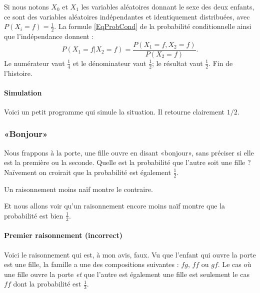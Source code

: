 Si nous notons \( X_0\) et \( X_1\) les variables aléatoires donnant le sexe des deux enfants, ce sont des variables aléatoires indépendantes et identiquement distribuées, avec \( P(X_i=f)=\frac{ 1 }{2}\). La formule \eqref{EqProbCond} de la probabilité conditionnelle ainsi que l'indépendance donnent :
\begin{equation}
	P(X_1=f|X_2=f)=\frac{ P(X_1=f,X_2=f) }{ P(X_2=f) }.
\end{equation}
Le numérateur vaut \( \frac{1}{ 4 }\) et le dénominateur vaut \( \frac{ 1 }{2}\); le résultat vaut \( \frac{ 1 }{2}\). Fin de l'histoire.

\paragraph{Simulation}

Voici un petit programme qui simule la situation. Il retourne clairement \( 1/2\).


\subsubsection{«Bonjour»}

Nous frappons à la porte, une fille ouvre en disant «bonjour», sans préciser si elle est la première ou la seconde. Quelle est la probabilité que l'autre soit une fille ? Naïvement on croirait que la probabilité est également \( \frac{ 1 }{2}\).

Un raisonnement moins naïf montre le contraire.

Et nous allons voir qu'un raisonnement encore moins naïf montre que la probabilité est bien \( \frac{ 1 }{2}\).

\paragraph{Premier raisonnement (incorrect)}

Voici le raisonnement qui est, à mon avis, faux. Vu que l'enfant qui ouvre la porte est une fille, la famille a une des compositions suivantes : \( fg\), \( ff\) ou \( gf\). Le cas où une fille ouvre la porte \emph{et} que l'autre est également une fille est seulement le cas \( ff\) dont la probabilité est \( \frac{1}{ 3 }\).

